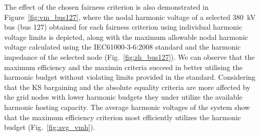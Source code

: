 The effect of the chosen fairness criterion is also demonstrated in Figure~\ref{fig:vm_bus127}, where the nodal harmonic voltage of a selected 380~kV bus (bus 127) obtained for each fairness criterion using individual harmonic voltage limits is depicted, along with the maximum allowable nodal harmonic voltage calculated using the IEC61000-3-6:2008 standard and the harmonic impedance of the selected node (Fig.~\ref{fig:zh_bus127}). We can observe that the maximum efficiency and the maximin criteria succeed in better utilising the harmonic budget without violating limits provided in the standard. Considering that the KS bargaining and the absolute equality criteria are more affected by the grid nodes with lower harmonic budgets they under utilize the available harmonic hosting capacity. The average harmonic voltages of the system show that the maximum efficiency criterion most efficiently utilizes the harmonic budget (Fig.~\ref{fig:avg_vmh}).

